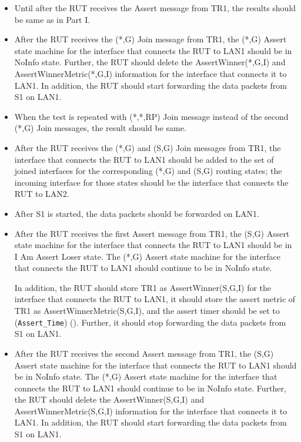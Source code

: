 \documentclass[11pt]{report}
\begin{document}

\begin{itemize}

  \item Until after the RUT receives the Assert message from TR1, the
  results should be same as in Part I.

  \item After the RUT receives the (*,G) Join message from TR1, the (*,G)
  Assert state machine for the interface that connects the RUT to LAN1 should
  be in NoInfo state.
  Further, the RUT should delete the AssertWinner(*,G,I) and
  AssertWinnerMetric(*,G,I) information for the interface that connects it to
  LAN1.
  In addition, the RUT should start forwarding the data packets from S1 on
  LAN1.

  \item When the test is repeated with (*,*,RP) Join message instead of the
  second (*,G) Join messages, the result should be same.

\end{itemize}


\begin{itemize}

  \item After the RUT receives the (*,G) and (S,G) Join messages from TR1, the
  interface that connects the RUT to LAN1 should be
  added to the set of joined interfaces for the corresponding (*,G) and (S,G)
  routing states; the incoming interface for those states should be the
  interface that connects the RUT to LAN2.

  \item After S1 is started, the data packets should be forwarded on LAN1.

  \item After the RUT receives the first Assert message from TR1, the (S,G)
  Assert state machine for the interface that connects the RUT to LAN1 should
  be in I Am Assert Loser state. The (*,G) Assert state machine for the
  interface that connects the RUT to LAN1 should continue to be in NoInfo
  state.

  In addition, the RUT should store TR1 as AssertWinner(S,G,I) for the
  interface that connects the RUT to LAN1, it should store the assert metric
  of TR1 as AssertWinnerMetric(S,G,I), and the assert timer should be set to
  (\verb=Assert_Time=) ({\PimsmAssertTime}).
  Further, it should stop forwarding the data packets from S1 on LAN1.

  \item After the RUT receives the second Assert message from TR1, the (S,G)
  Assert state machine for the interface that connects the RUT to LAN1 should
  be in NoInfo state. The (*,G) Assert state machine for the
  interface that connects the RUT to LAN1 should continue to be in NoInfo
  state.
  Further, the RUT should delete the AssertWinner(S,G,I) and
  AssertWinnerMetric(S,G,I) information for the interface that connects it to
  LAN1.
  In addition, the RUT should start forwarding the data packets from S1 on
  LAN1.

\end{itemize}
\end{document}
